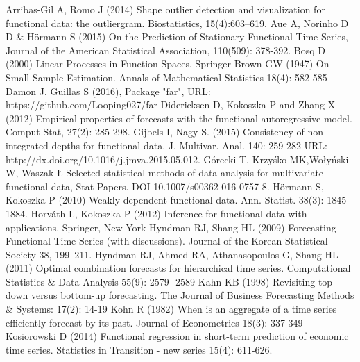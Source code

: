 \documentclass[12pt,a4paper]{article}
\numberwithin{equation}{section}
\begin{document}
\begin{thebibliography}{}

 Arribas-Gil A, Romo J (2014) Shape outlier detection and visualization for functional
data: the outliergram. Biostatistics, 15(4):603–619.
 Aue A, Norinho D D \& H\"ormann S (2015) On the Prediction of Stationary Functional Time Series, Journal of the American Statistical Association,
110(509): 378-392.
 Bosq D (2000) Linear Processes in Function Spaces. Springer
 Brown GW (1947) On Small-Sample Estimation. Annals of Mathematical Statistics 18(4): 582-585
 Damon J, Guillas S (2016), Package "far", URL: https://github.com/Looping027/far 
 Didericksen D, Kokoszka P and Zhang X (2012) Empirical properties of forecasts with the functional autoregressive model. Comput Stat, 27(2): 285-298.
 Gijbels I, Nagy S. (2015) Consistency of non-integrated depths for functional data. J. Multivar. Anal. 140: 259-282
URL: http://dx.doi.org/10.1016/j.jmva.2015.05.012.
 G\'orecki T, Krzy\'sko MK,Wo\l{}y\'nski W, Waszak \L{} Selected statistical methods of data analysis for multivariate functional data, Stat Papers. DOI 10.1007/s00362-016-0757-8.
 H\"ormann S, Kokoszka P (2010) Weakly dependent functional data. Ann. Statist. 38(3): 1845-1884.
Horv\'ath L, Kokoszka P (2012) Inference for functional data with applications. Springer, New York
 Hyndman RJ, Shang HL (2009) Forecasting Functional Time
Series (with discussions). Journal of the Korean Statistical Society 38, 199--211.
 Hyndman RJ, Ahmed RA, Athanasopoulos G, Shang HL (2011) Optimal combination forecasts for hierarchical time series. Computational Statistics \& Data Analysis 55(9): 2579 -2589
 Kahn KB (1998) Revisiting top-down versus bottom-up forecasting. The Journal of Business Forecasting Methods \& Systems: 17(2): 14-19
 Kohn R (1982) When is an aggregate of a time series efficiently forecast by its past. Journal of Econometrics 18(3): 337-349
 Kosiorowski D (2014) Functional regression in short-term prediction of economic time series. Statistics in Transition - new series 15(4): 611-626.

\end{thebibliography}
\end{document}
